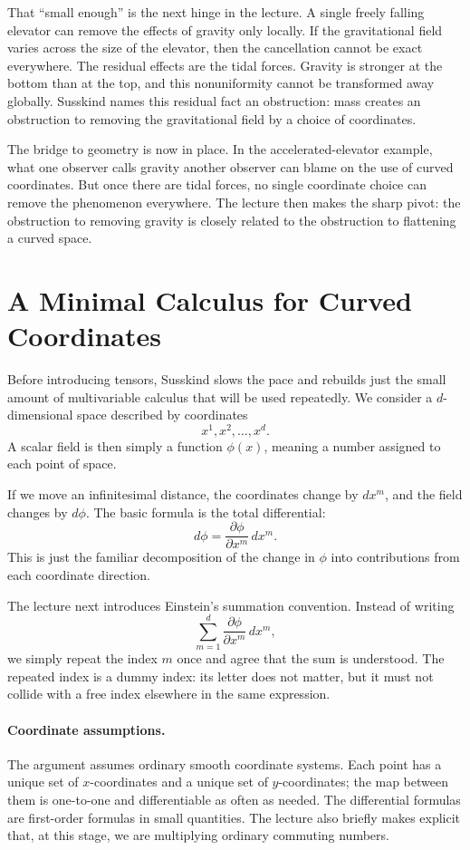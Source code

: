 That ``small enough'' is the next hinge in the lecture. A single freely falling elevator can remove the effects of gravity only locally. If the gravitational field varies across the size of the elevator, then the cancellation cannot be exact everywhere. The residual effects are the tidal forces. Gravity is stronger at the bottom than at the top, and this nonuniformity cannot be transformed away globally. Susskind names this residual fact an obstruction: mass creates an obstruction to removing the gravitational field by a choice of coordinates.

The bridge to geometry is now in place. In the accelerated-elevator example, what one observer calls gravity another observer can blame on the use of curved coordinates. But once there are tidal forces, no single coordinate choice can remove the phenomenon everywhere. The lecture then makes the sharp pivot: the obstruction to removing gravity is closely related to the obstruction to flattening a curved space.

\section{A Minimal Calculus for Curved Coordinates}

Before introducing tensors, Susskind slows the pace and rebuilds just the small amount of multivariable calculus that will be used repeatedly. We consider a \(d\)-dimensional space described by coordinates
\[
x^{1},x^{2},\dots,x^{d}.
\]
A scalar field is then simply a function \(\phi(x)\), meaning a number assigned to each point of space.

If we move an infinitesimal distance, the coordinates change by \(dx^{m}\), and the field changes by \(d\phi\). The basic formula is the total differential:
\begin{equation}
d\phi=\frac{\partial \phi}{\partial x^{m}}\,dx^{m}.
\end{equation}
This is just the familiar decomposition of the change in \(\phi\) into contributions from each coordinate direction.

The lecture next introduces Einstein's summation convention. Instead of writing
\[
\sum_{m=1}^{d}\frac{\partial \phi}{\partial x^{m}}\,dx^{m},
\]
we simply repeat the index \(m\) once and agree that the sum is understood. The repeated index is a dummy index: its letter does not matter, but it must not collide with a free index elsewhere in the same expression.

\paragraph{Coordinate assumptions.} The argument assumes ordinary smooth coordinate systems. Each point has a unique set of \(x\)-coordinates and a unique set of \(y\)-coordinates; the map between them is one-to-one and differentiable as often as needed. The differential formulas are first-order formulas in small quantities. The lecture also briefly makes explicit that, at this stage, we are multiplying ordinary commuting numbers.

